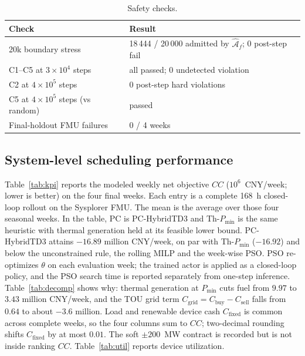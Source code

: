 \documentclass[conference]{IEEEtran}
\newcommand{\Afhat}{\widehat{\mathcal{A}}_{f}}
\begin{document}
\begin{table}[!t]
\caption{Safety checks.}
\label{tab:safety}
\centering
\scriptsize
\begin{tabular}{@{}ll@{}}
\toprule
Check & Result \\
\midrule
20k boundary stress & 18\,444 / 20\,000 admitted by \(\Afhat\); 0 post-step fail \\
C1--C5 at \(3\times10^{4}\) steps & all passed; 0 undetected violation \\
C2 at \(4\times10^{5}\) steps & 0 post-step hard violations \\
C5 at \(4\times10^{5}\) steps (vs random) & passed \\
Final-holdout FMU failures & 0 / 4 weeks \\
\bottomrule
\end{tabular}
\end{table}

\subsection{System-level scheduling performance}
\label{sec:kpi}

Table~\ref{tab:kpi} reports the modeled weekly net objective \(CC\) (\(10^6\)~CNY/week; lower is better) on the four final weeks. Each entry is a complete 168~h closed-loop rollout on the Sysplorer FMU. The mean is the average over those four seasonal weeks. In the table, PC is PC-HybridTD3 and Th-\(P_{\min}\) is the same heuristic with thermal generation held at its feasible lower bound. PC-HybridTD3 attains \(-16.89\) million CNY/week, on par with Th-\(P_{\min}\) (\(-16.92\)) and below the unconstrained rule, the rolling MILP and the week-wise PSO. PSO re-optimizes \(\theta\) on each evaluation week; the trained actor is applied as a closed-loop policy, and the PSO search time is reported separately from one-step inference. Table~\ref{tab:decomp} shows why: thermal generation at \(P_{\min}\) cuts fuel from \(9.97\) to \(3.43\) million CNY/week, and the TOU grid term \(C_{\mathrm{grid}}=C_{\mathrm{buy}}-C_{\mathrm{sell}}\) falls from \(0.64\) to about \(-3.6\) million. Load and renewable device cash \(C_{\mathrm{fixed}}\) is common across complete weeks, so the four columns sum to \(CC\); two-decimal rounding shifts \(C_{\mathrm{fixed}}\) by at most \(0.01\). The soft \(\pm200\)~MW contract is recorded but is not inside ranking \(CC\). Table~\ref{tab:util} reports device utilization.
\end{document}
